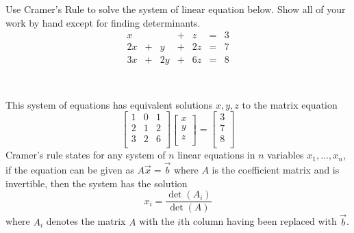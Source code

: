 \documentclass{article}
\begin{document}
\newpage
{} Use Cramer's Rule to solve the system of linear equation below.   Show all of your work by hand except for finding determinants. 
\[ 
\begin{array}{ccccccc}
x &  &&  +& z &  =  & 3	\\
2x & + &  y& +  &2z&  =  & 7\\
3x & + &  2y & +  & 6z &  =  & 8	\\
\end{array}
\]\\
\noindent\makebox[\linewidth]{\rule{\linewidth}{0.4pt}}\\
This system of equations has equivalent solutions \(x,y,z\) to the matrix equation
\[
  \begin{bmatrix}
    1 &0  &1   \\
     2&1  &2   \\
     3&2  &6   \\
  \end{bmatrix} \begin{bmatrix}
     x \\
      y\\
      z\\
  \end{bmatrix}=\begin{bmatrix}
     3 \\
     7 \\
     8 \\
  \end{bmatrix}
\]
Cramer's rule states for any system of \(n\) linear equations in \(n\) variables \(x_1,\ldots,x_n\), if the equation can be given as \(A \vec{x} =\vec{b} \) where \(A\) is the coefficient matrix and is invertible, then the system has the solution 
\[
  x_i=\frac{\det \left( A_i \right) }{\det \left( A \right) }
\]
where \(A_i\) denotes the matrix \(A\) with the \(i\)th column having been replaced with \(\vec{b} \).
\end{document}
